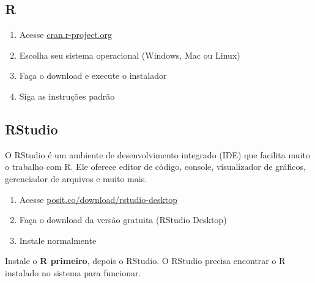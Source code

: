 \documentclass[
  letterpaper,
]{scrbook}
\providecommand{\tightlist}{%
  \setlength{\itemsep}{0pt}\setlength{\parskip}{0pt}}
\begin{document}
\subsection{R}\label{r}

\begin{enumerate}
\def\labelenumi{\arabic{enumi}.}
\tightlist
\item
  Acesse \href{https://cran.r-project.org/}{cran.r-project.org}
\item
  Escolha seu sistema operacional (Windows, Mac ou Linux)
\item
  Faça o download e execute o instalador
\item
  Siga as instruções padrão
\end{enumerate}

\subsection{RStudio}\label{rstudio}

O RStudio é um ambiente de desenvolvimento integrado (IDE) que facilita
muito o trabalho com R. Ele oferece editor de código, console,
visualizador de gráficos, gerenciador de arquivos e muito mais.

\begin{enumerate}
\def\labelenumi{\arabic{enumi}.}
\tightlist
\item
  Acesse
  \href{https://posit.co/download/rstudio-desktop/}{posit.co/download/rstudio-desktop}
\item
  Faça o download da versão gratuita (RStudio Desktop)
\item
  Instale normalmente
\end{enumerate}

\begin{tcolorbox}[enhanced jigsaw, arc=.35mm, bottomrule=.15mm, bottomtitle=1mm, breakable, colback=white, colbacktitle=quarto-callout-warning-color!10!white, colframe=quarto-callout-warning-color-frame, coltitle=black, left=2mm, leftrule=.75mm, opacityback=0, opacitybacktitle=0.6, rightrule=.15mm, title=\textcolor{quarto-callout-warning-color}{\faExclamationTriangle}\hspace{0.5em}{Atenção!}, titlerule=0mm, toprule=.15mm, toptitle=1mm]

Instale o \textbf{R primeiro}, depois o RStudio. O RStudio precisa
encontrar o R instalado no sistema para funcionar.

\end{tcolorbox}
\end{document}
